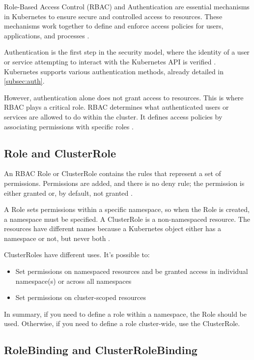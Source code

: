 \documentclass[a4paper,11pt,openright,BCOR=15mm]{scrbook}
\begin{document}
Role-Based Access Control (RBAC) and Authentication are essential mechanisms in Kubernetes to ensure secure and controlled access to resources. These mechanisms work together to define and enforce access policies for users, applications, and processes \cite{rostami_role-based_2023}.

Authentication is the first step in the security model, where the identity of a user or service attempting to interact with the Kubernetes API is verified \cite{rostami_role-based_2023}. Kubernetes supports various authentication methods, already detailed in \ref{subsec:auth}.

However, authentication alone does not grant access to resources. This is where RBAC plays a critical role. RBAC determines what authenticated users or services are allowed to do within the cluster. It defines access policies by associating permissions with specific roles \cite{rostami_role-based_2023}.

\subsection{Role and ClusterRole}

An RBAC Role or ClusterRole contains the rules that represent a set of permissions. Permissions are added, and there is no deny rule; the permission is either granted or, by default, not granted \cite{the_linux_foundation_rbacauthorization_2024}.

A Role sets permissions within a specific namespace, so when the Role is created, a namespace must be specified. A ClusterRole is a non-namespaced resource. The resources have different names because a Kubernetes object either has a namespace or not, but never both \cite{the_linux_foundation_rbacauthorization_2024}.

ClusterRoles have different uses. It's possible to:

\begin{itemize}
	\item Set permissions on namespaced resources and be granted access in individual namespace(s) or across all namespaces
	\item Set permissions on cluster-scoped resources
\end{itemize}

In summary, if you need to define a role within a namespace, the Role should be used. Otherwise, if you need to define a role cluster-wide, use the ClusterRole.


\subsection{RoleBinding and ClusterRoleBinding}
\end{document}
